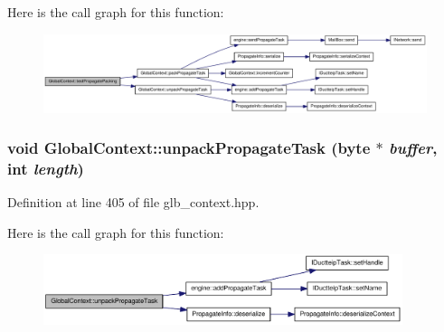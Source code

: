 Here is the call graph for this function:\nopagebreak
\begin{figure}[H]
\begin{center}
\leavevmode
\includegraphics[width=420pt]{class_global_context_a45180bd1ced20471a3489200c235ed37_cgraph}
\end{center}
\end{figure}
\hypertarget{class_global_context_a2f62ad628b6c5d48c2cda3ea05e08860}{
\subsubsection[{unpackPropagateTask}]{\setlength{\rightskip}{0pt plus 5cm}void GlobalContext::unpackPropagateTask ({\bf byte} $\ast$ {\em buffer}, \/  int {\em length})}}
\label{class_global_context_a2f62ad628b6c5d48c2cda3ea05e08860}


Definition at line 405 of file glb\_\-context.hpp.

Here is the call graph for this function:\nopagebreak
\begin{figure}[H]
\begin{center}
\leavevmode
\includegraphics[width=298pt]{class_global_context_a2f62ad628b6c5d48c2cda3ea05e08860_cgraph}
\end{center}
\end{figure}


